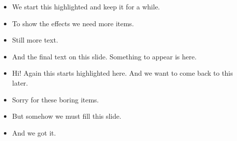 \documentclass[30pt,landscape,footrule]{foils}
\begin{document}
{\color{magenta}
\begin{itemize}
\item We start this highlighted and keep it for a while.
  \pause
\item To show the effects we need more items.\pause
\item Still more text. \pause
\item And the final text on this slide. \pause Something to appear is
  here.%
\end{itemize}
\pause}

{\color{magenta}\pausebuild
\begin{itemize}
\item Hi! \pause Again this starts highlighted here. \pause
  And we want to come back to this later.\pause%
\item Sorry for these boring items.\pause
\item But somehow we must fill this slide.\pause
\item And we got it.
\end{itemize}
\pause}
\end{document}
